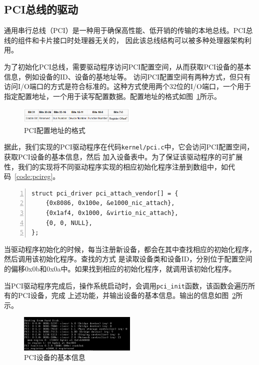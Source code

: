 \documentclass[a4paper,twoside]{ctexrep}
\begin{document}
\begin{spacing}{1.2}
\subsection{PCI总线的驱动}

通用串行总线（PCI）\cite{specification2020review}是一种用于确保高性能、低开销的传输的本地总线。PCI总线的组件和卡片接口时处理器无关的，
因此该总线结构可以被多种处理器架构利用。

为了初始化PCI总线，需要驱动程序访问PCI配置空间，从而获取PCI设备的基本信息，例如设备的ID、设备的基地址等。
访问PCI配置空间有两种方式，但只有访问I/O端口的方式是符合标准的。这种方式使用两个32位的I/O端口，一个用于
指定配置地址，一个用于读写配置数据。配置地址的格式如图~\ref{fig:pci_config_addr}所示。
\begin{figure}[htb]
	\centering
	\caption{PCI配置地址的格式}
	\label{fig:pci_config_addr}
	\includegraphics[width=0.5\textwidth]{controlreg.png}
\end{figure}
据此，我们实现的PCI驱动程序在代码\texttt{kernel/pci.c}中，它会访问PCI配置空间，获取PCI设备的基本信息，然后
加入设备表中。为了保证该驱动程序的可扩展性，我们的实现将不同驱动程序实现的相应初始化程序注册到数组中，如代码~\ref{code:pcireg}。
\begin{lstlisting}[numbers=left,style=CppStyle,caption={PCI驱动程序的初始化程序注册},label={code:pcireg}]
struct pci_driver pci_attach_vendor[] = {
	{0x8086, 0x100e, &e1000_nic_attach},
	{0x1af4, 0x1000, &virtio_nic_attach},
	{0, 0, NULL},
};
\end{lstlisting}
当驱动程序初始化的时候，每当注册新设备，都会在其中查找相应的初始化程序，然后调用该初始化程序。查找的方式
是读取设备类和设备ID，分别位于配置空间的偏移0x0b和0x0a中。如果找到相应的初始化程序，就调用该初始化程序。

当PCI驱动程序完成后，操作系统启动时，会调用\texttt{pci\_init}函数，该函数会遍历所有的PCI设备，完成
上述功能，并输出设备的基本信息。输出的信息如图~\ref{fig:initpci}所示。
\begin{figure}[htb]
	\centering
	\caption{PCI设备的基本信息}
	\label{fig:initpci}
	\includegraphics[width=0.5\textwidth]{initpci.png}
\end{figure}



\end{spacing}
\end{document}
